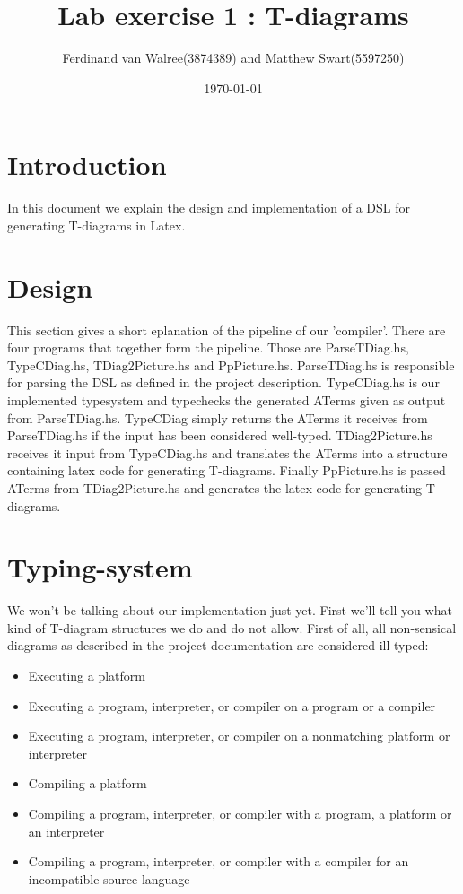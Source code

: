 \documentclass{article}
\title{Lab exercise 1 : T-diagrams}
\author {Ferdinand van Walree(3874389) and Matthew Swart(5597250)}
\date{\today}
\begin{document}
\maketitle



\section{Introduction}

In this document we explain the design and implementation of a DSL for generating T-diagrams in Latex.


\section{Design}

This section gives a short eplanation of the pipeline of our 'compiler'. There are four programs that together form the pipeline. Those are ParseTDiag.hs, TypeCDiag.hs, TDiag2Picture.hs and PpPicture.hs. ParseTDiag.hs is responsible for parsing the DSL as defined in the project description. TypeCDiag.hs is our implemented typesystem and typechecks the generated ATerms given as output from ParseTDiag.hs. TypeCDiag simply returns the ATerms it receives from ParseTDiag.hs if the input has been considered well-typed. TDiag2Picture.hs receives it input from TypeCDiag.hs and translates the ATerms into a structure containing latex code for generating T-diagrams. Finally PpPicture.hs is passed ATerms from TDiag2Picture.hs and generates the latex code for generating T-diagrams.

\section{Typing-system}

We won't be talking about our implementation just yet. First we'll tell you what kind of T-diagram structures we do and do not allow.
First of all, all non-sensical diagrams as described in the project documentation are considered ill-typed:

\begin{itemize}
	\item Executing a platform
	\item Executing a program, interpreter, or compiler on a program or a compiler
	\item Executing a program, interpreter, or compiler on a nonmatching platform or interpreter
	\item Compiling a platform
	\item Compiling a program, interpreter, or compiler with a program, a platform or an interpreter
	\item Compiling a program, interpreter, or compiler with a compiler for an incompatible source language
\end{itemize}
\end{document}
